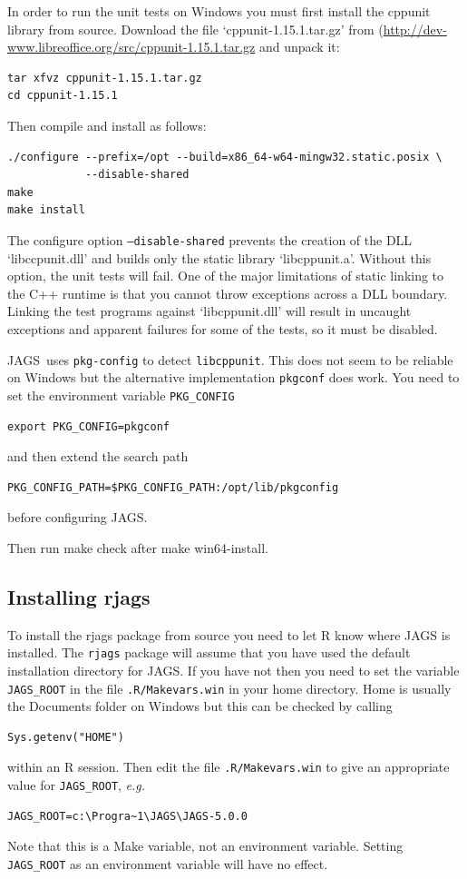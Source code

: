 \documentclass[11pt, a4paper, titlepage]{article}
\newcommand{\JAGS}{\textsf{JAGS}}
\newcommand{\code}[1]{{\bgroup{\normalfont\ttfamily #1}\egroup}}
\newcommand{\file}[1]{{`\normalfont\textsf{#1}'}}
\begin{document}
In order to run the unit tests on Windows you must first install the
cppunit library from source. Download the file \file{cppunit-1.15.1.tar.gz}
from (\url{http://dev-www.libreoffice.org/src/cppunit-1.15.1.tar.gz}
and unpack it:
\begin{verbatim}
tar xfvz cppunit-1.15.1.tar.gz
cd cppunit-1.15.1
\end{verbatim}
Then compile and install as follows:
\begin{verbatim}
./configure --prefix=/opt --build=x86_64-w64-mingw32.static.posix \
            --disable-shared
make
make install
\end{verbatim}

The configure option \texttt{--disable-shared} prevents the creation
of the DLL \file{libccpunit.dll} and builds only the static library
\file{libcppunit.a}. Without this option, the unit tests will fail.
One of the major limitations of static linking to the C++ runtime is
that you cannot throw exceptions across a DLL boundary.  Linking the
test programs against \file{libcppunit.dll} will result in uncaught
exceptions and apparent failures for some of the tests, so it must be
disabled.

\JAGS\ uses \texttt{pkg-config} to detect \texttt{libcppunit}. This
does not seem to be reliable on Windows but the alternative implementation
\texttt{pkgconf} does work. You need to set the environment variable
\texttt{PKG\_CONFIG}
\begin{verbatim}
export PKG_CONFIG=pkgconf
\end{verbatim}
and then extend the search path
\begin{verbatim}
PKG_CONFIG_PATH=$PKG_CONFIG_PATH:/opt/lib/pkgconfig
\end{verbatim}
before configuring \JAGS.

Then run \code{make check} after \code{make win64-install}.

\subsection{Installing rjags}

To install the \textsf{rjags} package from source you need to let R
know where JAGS is installed. The \texttt{rjags} package will assume
that you have used the default installation directory for \JAGS. If
you have not then you need to set the variable \texttt{JAGS\_ROOT} in
the file \texttt{.R/Makevars.win} in your home directory. Home is
usually the Documents folder on Windows but this can be checked by
calling
\begin{verbatim}
Sys.getenv("HOME")
\end{verbatim}
within an R session. Then edit the file \texttt{.R/Makevars.win} to
give an appropriate value for \texttt{JAGS\_ROOT}, {\em e.g.} 
\begin{verbatim}
JAGS_ROOT=c:\Progra~1\JAGS\JAGS-5.0.0
\end{verbatim}
Note that this is a Make variable, not an environment
variable. Setting \texttt{JAGS\_ROOT} as an environment variable will
have no effect.
\end{document}
